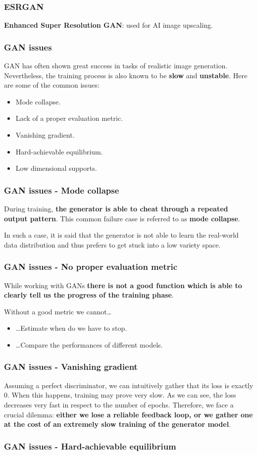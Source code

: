 \begin{frame}
    \frametitle{ESRGAN}
    \textbf{Enhanced Super Resolution GAN}: used for AI image upscaling.
\end{frame}

\begin{frame}
    \frametitle{GAN issues}
    GAN has often shown great success in tasks of realistic image generation. Nevertheless, the training process is also known to be \textbf{slow} and \textbf{unstable}. Here are some of the common issues:
    \begin{itemize}
        \item Mode collapse.
        \item Lack of a proper evaluation metric.
        \item Vanishing gradient.
        \item Hard-achievable equilibrium.
        \item Low dimensional supports.
    \end{itemize}
\end{frame}

\begin{frame}
    \frametitle{GAN issues - Mode collapse}
    During training, \textbf{the generator is able to cheat through a repeated output pattern}. This common failure case is referred to as \textbf{mode collapse}.

    In such a case, it is said that the generator is not able to learn the real-world data distribution and thus prefers to get stuck into a low variety space.

\end{frame}

\begin{frame}
    \frametitle{GAN issues - No proper evaluation metric}
    While working with GANs \textbf{there is not a good function which is able to clearly tell us the progress of the training phase}.

    Without a good metric we cannot\dots
    \begin{itemize}
        \item \dots Estimate when do we have to stop.
        \item \dots Compare the performances of different models.
    \end{itemize}
\end{frame}

\begin{frame}
    \frametitle{GAN issues - Vanishing gradient}
    Assuming a perfect discriminator, we can intuitively gather that its loss is exactly $0$. When this happens, training may prove very slow.
    As we can see, the loss decreases very fast in respect to the number of epochs. Therefore, we face a crucial dilemma: \textbf{either we lose a reliable feedback loop, or we gather one at the cost of an extremely slow training of the generator model}.
\end{frame}

\begin{frame}
    \frametitle{GAN issues - Hard-achievable equilibrium}
\end{frame}